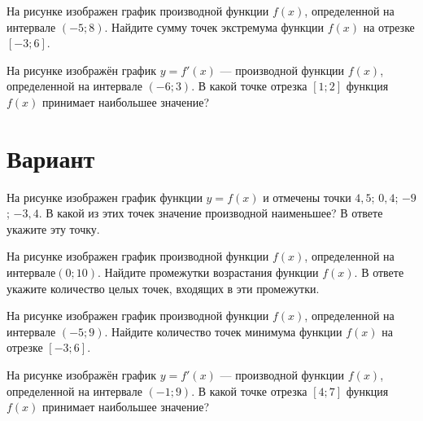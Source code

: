 \begin{taskBN}{3}
На рисунке изображен график производной функции $f(x)$, определенной на интервале $(-5;8)$. Найдите сумму точек экстремума функции $f(x)$ на отрезке $[-3;6]$.
\end{taskBN}

\begin{taskBN}{4}
На рисунке изображён график $y=f'(x)$ — производной функции $f(x)$, определенной на интервале $(-6;3)$. В какой точке отрезка $[1; 2]$ функция $f(x)$ принимает наибольшее значение?
\end{taskBN}

\newpage\section{Вариант}\begin{taskBN}{1}
На рисунке изображен график функции $y=f(x)$ и отмечены точки $4,5$; $0,4$; $-9$; $-3,4$. В какой из этих точек значение производной наименьшее? В ответе укажите эту точку. 
\end{taskBN}

\begin{taskBN}{2}
На рисунке изображен график производной функции $f(x)$, определенной на интервале$(0; 10)$. Найдите промежутки возрастания функции $f(x)$. В ответе укажите количество целых точек, входящих в эти промежутки.
\end{taskBN}

\begin{taskBN}{3}
На рисунке изображен график производной функции $f(x)$, определенной на интервале $(-5;9)$. Найдите количество точек минимума функции $f(x)$ на отрезке $[-3;6]$. 
\end{taskBN}

\begin{taskBN}{4}
На рисунке изображён график $y=f'(x)$ — производной функции $f(x)$, определенной на интервале $(-1;9)$. В какой точке отрезка $[4; 7]$ функция $f(x)$ принимает наибольшее значение?
\end{taskBN}

